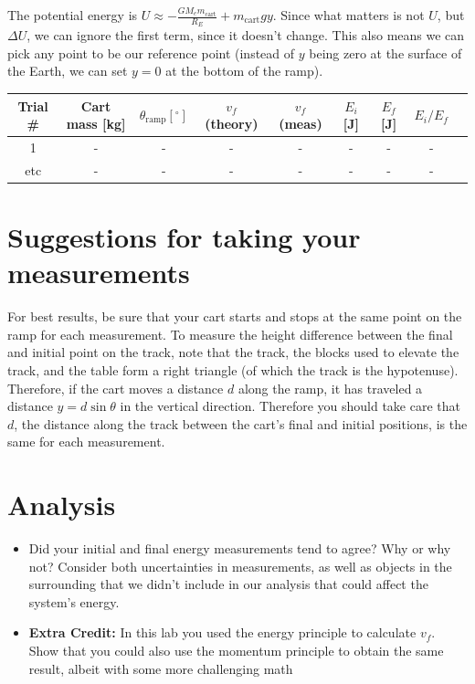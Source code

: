 \documentclass{article}
\begin{document}
The potential energy is $U\approx -\frac{GM_em_\mathrm{cart}}{R_E}+m_\mathrm{cart}gy$. Since what matters is not $U$, but $\Delta U$, we can ignore the first term, since it doesn't change. This also means we can pick any point to be our reference point (instead of $y$ being zero at the surface of the Earth, we can set $y=0$ at the bottom of the ramp).

\begin{center}
\begin{tabular}{|c|c|c|c|c|c|c|c|c|}
	\hline 
	Trial \# & Cart mass [kg] & $\theta_\mathrm{ramp} [^\circ]$ &$v_f$ (theory)&$v_f$ (meas)& $E_i$ [J]&$E_f$ [J]&$E_i/E_f$ \\\hline
	1 & - & - & - & - & - & - & - \\ \hline
	etc & - & - & - & - & - & - & - \\ \hline
\end{tabular}
\end{center}

\section*{Suggestions for taking your measurements}
For best results, be sure that your cart starts and stops at the same point on the ramp for each measurement. To measure the height difference between the final and initial point on the track, note that the track, the blocks used to elevate the track, and the table form a right triangle (of which the track is the hypotenuse). Therefore, if the cart moves a distance $d$ along the ramp, it has traveled a distance $y=d\sin{\theta}$ in the vertical direction. Therefore you should take care that $d$, the distance along the track between the cart's final and initial positions, is the same for each measurement.

\section*{Analysis}
\begin{itemize}
	\item Did your initial and final energy measurements tend to agree? Why or why not? Consider both uncertainties in measurements, as well as objects in the surrounding that we didn't include in our analysis that could affect the system's energy.
	\item \textbf{Extra Credit:} In this lab you used the energy principle to calculate $v_f$. Show that you could also use the momentum principle to obtain the same result, albeit with some more challenging math
\end{itemize}
\end{document}
